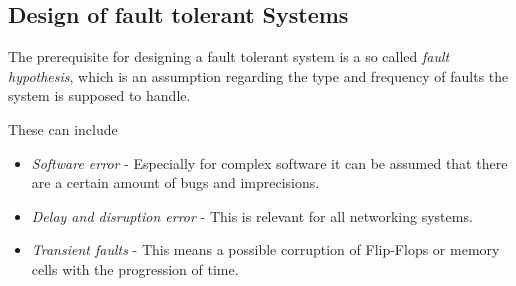 \subsection{Design of fault tolerant Systems}
The prerequisite for designing a fault tolerant system is a so called \emph{fault hypothesis}, which is an assumption regarding the type and frequency of faults the system is supposed to handle.

These can include
\begin{itemize}
\item \emph{Software error} - Especially for complex software it can be assumed that there are a certain amount of bugs and imprecisions.
\item \emph{Delay and disruption error} - This is relevant for all networking systems.
\item \emph{Transient faults} - This means a possible corruption of Flip-Flops or memory cells with the progression of time.
\end{itemize}